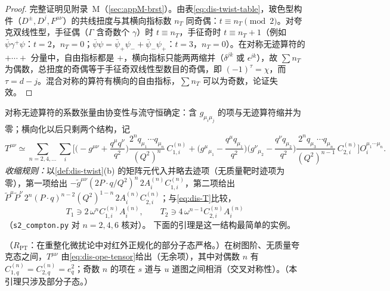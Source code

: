 \begin{proof}
完整证明见附录~M（\cref{sec:appM-brst}）。由表\cref{eq:dis-twist-table}，玻色型构件（$D^\pm,D^j,F^{\mu\nu}$）的共线扭度与其横向指标数 $n_T$ 同奇偶：$t\equiv n_T\pmod 2$。对夸克双线性型，手征偶（$\Gamma$ 含奇数个 $\gamma$）时 $t\equiv n_T$，手征奇时 $t\equiv n_T+1$（例如 $\bar\psi\gamma^+\psi$：$t=2$，$n_T=0$；$\bar\psi\psi=\bar\psi_+\psi_-+\bar\psi_-\psi_+$：$t=3$，$n_T=0$）。在对称无迹算符的 $+\cdots+$ 分量中，自由指标都是 $+$，横向指标只能两两缩并（$\delta^{jk}$ 或 $\epsilon^{jk}$），故 $\sum n_T$ 为偶数，总扭度的奇偶等于手征奇双线性型数目的奇偶，即 $(-1)^{\tau}=\chi$，而 $\tau=d-j$。混合对称的算符有横向的自由指标，$\sum n_T$ 可以为奇数，论证失效。
\end{proof}

对称无迹算符的系数张量由协变性与流守恒确定：含 $g_{\mu_i\mu_j}$ 的项与无迹算符缩并为零；横向化以后只剩两个结构，记
\begin{equation}\label{eq:dis-ope-tensor}
T^{\mu\nu}\simeq\sum_{n=2,4,\dots}\sum_i\Big[\Big(-g^{\mu\nu}+\frac{q^\mu q^\nu}{q^2}\Big)\frac{2^nq_{\mu_1}\cdots q_{\mu_n}}{(Q^2)^n}\,C^{(n)}_{1,i}
+\Big(g^\mu{}_{\mu_1}-\frac{q^\mu q_{\mu_1}}{q^2}\Big)\Big(g^\nu{}_{\mu_2}-\frac{q^\nu q_{\mu_2}}{q^2}\Big)\frac{2^nq_{\mu_3}\cdots q_{\mu_n}}{(Q^2)^{n-1}}\,C^{(n)}_{2,i}\Big]O_i^{\mu_1\cdots\mu_n}.
\end{equation}
\emph{收缩规则：}以\cref{def:dis-twist}(b) 的矩阵元代入并略去迹项（无质量靶时迹项为零），第一项给出 $-\tilde g^{\mu\nu}(2P\cdot q/Q^2)^n\,2A^{(n)}_iC^{(n)}_{1,i}$，第二项给出 $\tilde P^\mu\tilde P^\nu\,2^n(P\cdot q)^{n-2}(Q^2)^{1-n}\,2A^{(n)}_iC^{(n)}_{2,i}$；与\cref{eq:dis-T}比较，
\begin{equation}\label{eq:dis-contraction}
T_1\ni2\,\omega^nC^{(n)}_{1,i}A^{(n)}_i,\qquad T_2\ni4\,\omega^{n-1}C^{(n)}_{2,i}A^{(n)}_i
\end{equation}
（\texttt{s2\_compton.py} 对 $n=2,4,6$ 核对）。%
下面的引理是这一结构最简单的实例。

\begin{lemma}\label{lem:dis-tree-ope}
（$R_{\mathrm{PT}}$：在重整化微扰论中对红外正规化的部分子态严格。）在树图阶、无质量夸克态之间，$T^{\mu\nu}$ 由\cref{eq:dis-ope-tensor}给出（无余项），其中对偶数 $n$ 有 $C^{(n)}_{1,q}=C^{(n)}_{2,q}=e_q^2$；奇数 $n$ 的项在 $s$ 道与 $u$ 道图之间相消（交叉对称性）。（本引理只涉及部分子态。）
\end{lemma}

